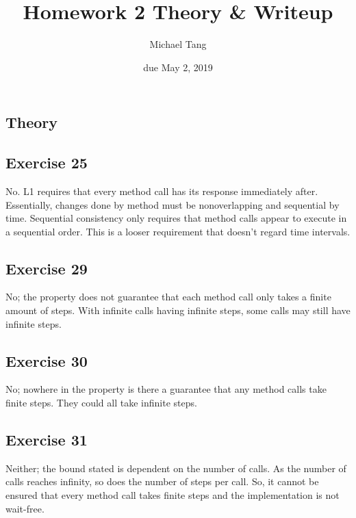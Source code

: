 \documentclass{article}
\title{Homework 2 Theory \& Writeup}
\author{Michael Tang}
\date{due May 2, 2019}
\begin{document}
\maketitle
\begin{adjustwidth}{-2cm}{-2cm}
\section{Theory}
\subsection{Exercise 25}
No. L1 requires that every method call has its response immediately after. Essentially, changes done by method must be nonoverlapping and sequential by time. Sequential consistency only requires that method calls appear to execute in a sequential order. This is a looser requirement that doesn't regard time intervals.

\subsection{Exercise 29}
No; the property does not guarantee that each method call only takes a finite amount of steps. With infinite calls having infinite steps, some calls may still have infinite steps. 

\subsection{Exercise 30}
No; nowhere in the property is there a guarantee that any method calls take finite steps. They could all take infinite steps.

\subsection{Exercise 31}
Neither; the bound stated is dependent on the number of calls. As the number of calls reaches infinity, so does the number of steps per call. So, it cannot be ensured that every method call takes finite steps and the implementation is not wait-free.


\end{adjustwidth}
\end{document}
